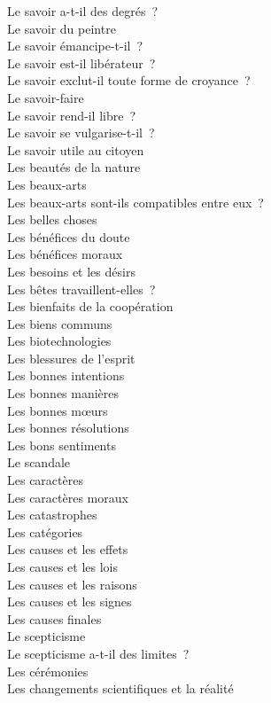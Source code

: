 \documentclass[a4paper,12pt]{article}
\begin{document}
Le savoir a-t-il des degrés ? \\
Le savoir du peintre \\
Le savoir émancipe-t-il ? \\
Le savoir est-il libérateur ? \\
Le savoir exclut-il toute forme de croyance ? \\
Le savoir-faire \\
Le savoir rend-il libre ? \\
Le savoir se vulgarise-t-il ? \\
Le savoir utile au citoyen \\
Les beautés de la nature \\
Les beaux-arts \\
Les beaux-arts sont-ils compatibles entre eux ? \\
Les belles choses \\
Les bénéfices du doute \\
Les bénéfices moraux \\
Les besoins et les désirs \\
Les bêtes travaillent-elles ? \\
Les bienfaits de la coopération \\
Les biens communs \\
Les biotechnologies \\
Les blessures de l'esprit \\
Les bonnes intentions \\
Les bonnes manières \\
Les bonnes mœurs \\
Les bonnes résolutions \\
Les bons sentiments \\
Le scandale \\
Les caractères \\
Les caractères moraux \\
Les catastrophes \\
Les catégories \\
Les causes et les effets \\
Les causes et les lois \\
Les causes et les raisons \\
Les causes et les signes \\
Les causes finales \\
Le scepticisme \\
Le scepticisme a-t-il des limites ? \\
Les cérémonies \\
Les changements scientifiques et la réalité \\
\end{document}

